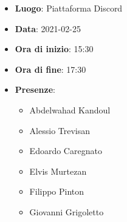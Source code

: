 \begin{itemize}
    \item \textbf{Luogo}: Piattaforma Discord
    \item \textbf{Data}: 2021-02-25
    \item \textbf{Ora di inizio}: 15:30
    \item \textbf{Ora di fine}: 17:30
    \item \textbf{Presenze}:
          \begin{itemize}
              \item Abdelwahad Kandoul
              \item Alessio Trevisan
              \item Edoardo Caregnato
              \item Elvis Murtezan
              \item Filippo Pinton
              \item Giovanni Grigoletto
          \end{itemize}
\end{itemize}